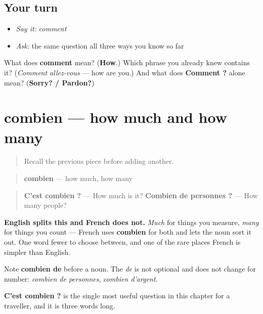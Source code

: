 \subsection*{Your turn}
\begin{itemize}
\raggedright
  \item \emph{Say it:} \emph{comment}
  \item \emph{Ask:} the same question all three ways you know so far
\end{itemize}

\begin{tcolorbox}[breakable,colback=teal!4,colframe=teal!35!black,title={Before you move on}]
What does \textbf{comment} mean? (\textbf{How}.) Which phrase you already knew contains it? (\emph{Comment allez-vous} — how are you.) And what does \textbf{Comment ?} alone mean? (\textbf{Sorry? / Pardon?})
\end{tcolorbox}
\section[combien]{combien — how much and how many}

\label{lesson:FR-C32-combien}



\begin{quote}
Recall the previous piece before adding another.
\end{quote}

\begin{cousinweb}
\begin{quote}
\textbf{combien} — how much, how many
\end{quote}

\begin{quote}
\textbf{C'est combien ?} — How much is it? \textbf{Combien de personnes ?} — How many people?
\end{quote}

\textbf{English splits this and French does not.} \emph{Much} for things you measure, \emph{many} for things you count — French uses \textbf{combien} for both and lets the noun sort it out. One word fewer to choose between, and one of the rare places French is simpler than English.

Note \textbf{combien de} before a noun. The \emph{de} is not optional and does not change for number: \emph{combien de personnes}, \emph{combien d'argent}.

\textbf{C'est combien ?} is the single most useful question in this chapter for a traveller, and it is three words long.
\end{cousinweb}

